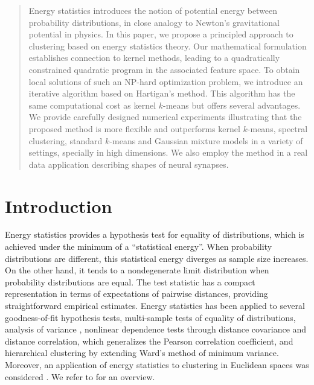 \documentclass{article}
\begin{document}
\begin{abstract}
Energy statistics introduces the notion of potential
energy between probability distributions, in  
close analogy to Newton's gravitational
potential in physics. In this paper, we propose a principled approach to 
clustering based on energy statistics theory.
Our mathematical formulation establishes connection to kernel methods,
leading to a quadratically constrained quadratic program in the associated
feature space.
To obtain local solutions of such an NP-hard optimization problem,
we introduce an iterative algorithm based
on Hartigan's method. This algorithm has the same computational 
cost as kernel $k$-means but offers
several advantages. 
We provide carefully designed numerical experiments illustrating
that the proposed method is more flexible and outperforms
kernel $k$-means, spectral clustering,
standard $k$-means and Gaussian mixture models in a variety of settings,
specially in high dimensions. We also employ the method 
in a real data application describing shapes of neural synapses.
\end{abstract}


\section{Introduction}

Energy statistics \citep{Szkely2013}
provides a hypothesis test for equality of 
distributions, which is achieved 
under the minimum of a ``statistical energy''. 
When probability distributions are different, this
statistical energy diverges as sample size increases. On the other hand,
it tends to a nondegenerate limit distribution when probability
distributions are equal.
The test statistic has a compact representation
in terms of expectations of pairwise distances, providing
straightforward empirical estimates. Energy statistics
has been applied to several goodness-of-fit 
hypothesis tests, multi-sample tests of equality of distributions, 
analysis of variance \citep{RizzoVariance}, nonlinear dependence tests through
distance covariance and distance correlation, which generalizes the Pearson
correlation coefficient, and hierarchical clustering \citep{RizzoClustering} 
by extending Ward's method of minimum variance. Moreover, an application of 
energy statistics to clustering in Euclidean spaces was 
considered \citep{Kgroups}.  
We refer to \citep{Szkely2013} for an overview.
\end{document}
